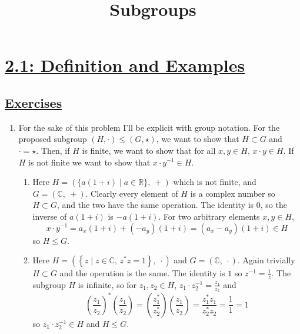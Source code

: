 \documentclass[]{article}
\title{Subgroups}
\author{}
\date{}
\newcommand{\bbr}{\mathbb{R}}
\newcommand{\bbc}{\mathbb{C}}
\begin{document}
\maketitle
\vspace{-5em}

\tableofcontents

\section*{\underline{2.1: Definition and Examples}}
\subsection*{\underline{Exercises}}
\begin{enumerate}

\item For the sake of this problem I'll be explicit with group notation. For the proposed subgroup $(H,\cdot) \leq (G,\star)$, we want to show that $H \subset G$ and $\cdot = \star$. Then, if $H$ is finite, we want to show that for all $x,y\in H$, $x\cdot y \in H$. If $H$ is not finite we want to show that $x\cdot y^{-1} \in H$.
\begin{enumerate}
\item Here $H = \left( \{a(1+i)\mid a\in\bbr\},\ + \right)$ which is not finite, and $G = \left(\bbc,\ +\right)$. Clearly every element of $H$ is a complex number so $H \subset G$, and the two have the same operation. The identity is $0$, so the inverse of $a(1+i)$ is $-a(1+i)$. For two arbitrary elements $x,y\in H$,
\begin{equation}
x\cdot y^{-1} = a_x(1+i) + (-a_y)(1+i) = (a_x-a_y)(1+i) \in H
\end{equation}
so $H \leq G$.

\item Here $H = \left( \left\{z\mid z\in\bbc,\, z^*z=1\right\},\ \cdot \right)$ and $G = \left(\bbc,\ \cdot\right)$. Again trivially $H \subset G$ and the operation is the same. The identity is $1$ so $z^{-1} = \frac{1}{z}$. The subgroup $H$ is infinite, so for $z_1,z_2\in H$, $z_1\cdot z_2^{-1} = \frac{z_1}{z_2}$ and
\begin{equation}
\left( \frac{z_1}{z_2} \right)^* \left( \frac{z_1}{z_2} \right) = \left( \frac{z_1^*}{z_2^*} \right)\left( \frac{z_1}{z_2} \right) = \frac{z_1^*z_1}{z_2^*z_2} = \frac{1}{1} = 1
\end{equation}
so $z_1\cdot z_2^{-1} \in H$ and $H \leq G$.


\end{enumerate}
\end{enumerate}
\end{document}
